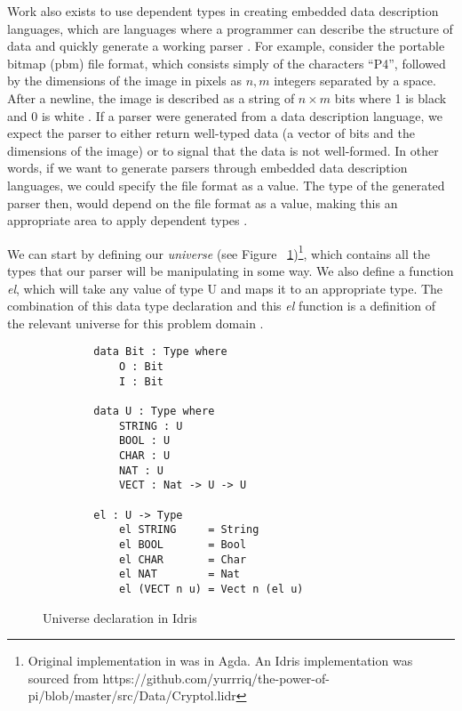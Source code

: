 Work also exists to use dependent types in creating embedded data description
languages, which are languages where a programmer can describe the structure of
data and quickly generate a working parser \cite{power_of_pi}.  For example,
consider the portable bitmap (pbm) file format, which consists simply of the
characters ``P4'', followed by the dimensions of the image in pixels as $n, m$
integers separated by a space. After a newline, the image is described as a
string of $n\times m $ bits where 1 is black and 0 is white \cite{pmb_spec}. If
a parser were generated from a data description language, we expect the parser
to either return well-typed data (a vector of bits and the dimensions of the
image) or to signal that the data is not well-formed. In other words, if we want
to generate parsers through embedded data description languages, we could
specify the file format as a value. The type of the generated parser then, would
depend on the file format as a value, making this an appropriate area to apply
dependent types \cite{power_of_pi}. 

We can start by defining our \textit{universe} (see Figure
~\ref{universe})\footnote{\label{idris_source}Original implementation in
\cite{power_of_pi} was in Agda. An Idris implementation was sourced from
https://github.com/yurrriq/the-power-of-pi/blob/master/src/Data/Cryptol.lidr },
which contains all the types that our parser will be manipulating in some way.
We also define a function \textit{el}, which will take any value of type U and
maps it to an appropriate type. The combination of this data type declaration
and this \textit{el} function is a definition of the relevant universe for this
problem domain \cite{power_of_pi}. 

\begin{figure}[h]
    \caption{Universe declaration in Idris \protect\cite{power_of_pi}}
    \label{universe}
    \begin{lstlisting}
        data Bit : Type where 
            O : Bit 
            I : Bit

        data U : Type where
            STRING : U
            BOOL : U
            CHAR : U
            NAT : U
            VECT : Nat -> U -> U
        
        el : U -> Type
            el STRING     = String
            el BOOL       = Bool
            el CHAR       = Char
            el NAT        = Nat
            el (VECT n u) = Vect n (el u)
    \end{lstlisting}
\end{figure}

